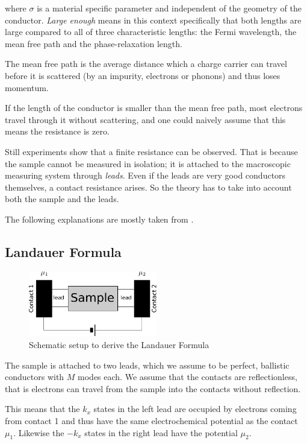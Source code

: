 \documentclass[11pt,twoside]{book}
\begin{document}
where $\sigma$ is a material specific parameter and independent of the
geometry of the conductor. \emph{Large enough} means in this context
specifically that both lengths are large compared to all of three
characteristic lengths: the Fermi wavelength, the mean free path and the
phase-relaxation length.

The mean free path is the average distance which a charge carrier can travel
before it is scattered (by an impurity, electrons or phonons) and thus loses
momentum.

If the length of the conductor is smaller than the mean free path, most
electrons travel through it without scattering, and one could naively assume
that this means the resistance is zero.

Still experiments show that a finite resistance can be observed. That is
because the sample cannot be measured in isolation; it is attached to the
macroscopic measuring system through \emph{leads}. Even if the leads are very
good conductors themselves, a contact resistance arises. So the theory has to
take into account both the sample and the leads.

The following explanations are mostly taken from \cite{datta}.

\subsection*{Landauer Formula}

\begin{figure}
    \begin{center}
        \includegraphics[width=0.5\textwidth]{sample-leads}
    \end{center}
    \caption{Schematic setup to derive the Landauer Formula}
    \label{fig:sample-leads}
\end{figure}

The sample is attached to two leads, which we assume to be perfect, ballistic
conductors with $M$ modes each. We assume that the contacts are
reflectionless, that is electrons can travel from the sample into the contacts
without reflection.

This means that the $k_x$ states in the left lead are occupied by electrons
coming from contact 1 and thus have the same electrochemical potential as
the contact $\mu_1$. Likewise the $-k_x$ states in the right lead have the
potential $\mu_2$.
\end{document}
